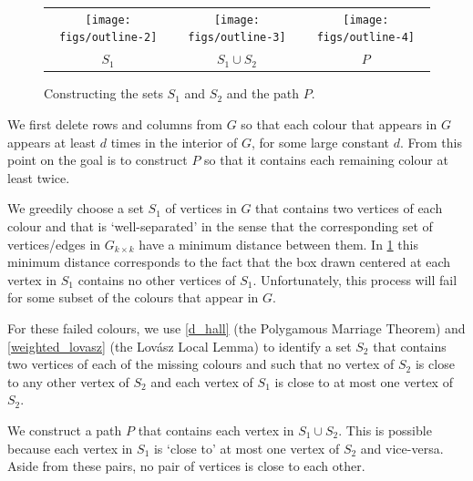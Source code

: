 \documentclass{patmorin}
\begin{document}
\begin{figure}
  \begin{center}
    \begin{tabular}{ccc}
      \texttt{[image: figs/outline-2]} &
      \texttt{[image: figs/outline-3]} &
      \texttt{[image: figs/outline-4]} \\
      $S_1$ & $S_1\cup S_2$ & $P$
    \end{tabular}
  \end{center}
  \caption{Constructing the sets $S_1$ and $S_2$ and the path $P$.}
  \label{outline}
\end{figure}
\begin{compactenum}

  \item We first delete rows and columns from $G$ so that each colour that appears in $G$ appears at least $d$ times in the interior of $G$, for some large constant $d$.  From this point on the goal is to construct $P$ so that it contains each remaining colour at least twice.

  \item We greedily choose a set $S_1$ of vertices in $G$ that contains two vertices of each colour and that is `well-separated' in the sense that the corresponding set of vertices/edges in $G_{k\times k}$ have a minimum distance between them.  In \cref{outline} this minimum distance corresponds to the fact that the box drawn centered at each vertex in $S_1$ contains no other vertices of $S_1$.
  Unfortunately, this process will fail for some subset of the colours that appear in $G$.

  \item For these failed colours, we use \cref{d_hall} (the Polygamous Marriage Theorem) and \cref{weighted_lovasz} (the Lovász Local Lemma) to identify a set $S_2$ that contains two vertices of each of the missing colours and such that no vertex of $S_2$ is close to any other vertex of $S_2$ and each vertex of $S_1$ is close to at most one vertex of $S_2$.

  \item We construct a path $P$ that contains each vertex in $S_1\cup S_2$.  This is possible because each vertex in $S_1$ is `close to' at most one vertex of $S_2$ and vice-versa.  Aside from these pairs, no pair of vertices is close to each other.
\end{compactenum}
\end{document}
